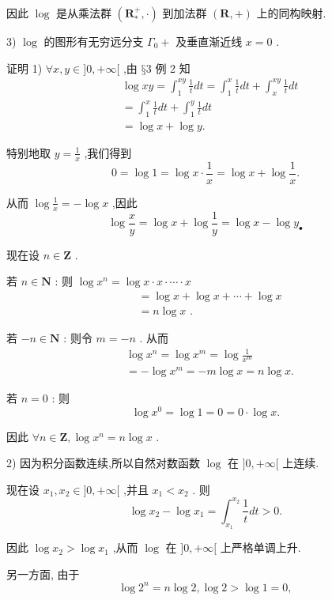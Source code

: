 因此 $\log$ 是从乘法群 $\left( {{\mathbf{R}}_{ * }^{ + }, \cdot  }\right)$ 到加法群 $\left( {\mathbf{R}, + }\right)$ 上的同构映射.

3) $\log$ 的图形有无穷远分支 ${\Gamma }_{0} +$ 及垂直渐近线 $x = 0$ .

证明 1) $\forall x,y \in  \rbrack 0, + \infty \lbrack$ ,由 $§3$ 例 2 知
\begin{align*}
	&\log {xy} = {\int }_{1}^{xy}\frac{1}{t}{dt} = {\int }_{1}^{x}\frac{1}{t}{dt} + {\int }_{x}^{xy}\frac{1}{t}{dt}\\
	&= {\int }_{1}^{x}\frac{1}{t}{dt} + {\int }_{1}^{y}\frac{1}{t}{dt}\\
	&= \log x + \log y.
\end{align*}

特别地取 $y = \frac{1}{x}$ ,我们得到
$$0 = \log 1 = \log x \cdot  \frac{1}{x} = \log x + \log \frac{1}{x}.$$

从而 $\log \frac{1}{x} =  - \log x$ ,因此
$$\log \frac{x}{y} = \log x + \log \frac{1}{y} = \log x - \log {y}_{ \bullet  }$$

现在设 $n \in  \mathbf{Z}$ .

若 $n \in  \mathbf{N}$ : 则 $\log {x}^{n} = \log x \cdot  x \cdot  \cdots  \cdot  x$
\begin{align*}
	&= \log x + \log x + \cdots  + \log x\\
	&= n\log x\text{ . }
\end{align*}

若 $- n \in  \mathbf{N}$ : 则令 $m =  - n$ . 从而
\begin{align*}
	&\log {x}^{n} = \log {x}^{m} = \log \frac{1}{{x}^{m}}\\
	&=  - \log {x}^{m} =  - m\log x = n\log x.
\end{align*}

若 $n = 0$ : 则
$$\log {x}^{0} = \log 1 = 0 = 0 \cdot  \log x.$$

因此 $\forall n \in  \mathbf{Z},\log {x}^{n} = n\log x$ .

2) 因为积分函数连续,所以自然对数函数 $\log$ 在 $\rbrack 0, + \infty \lbrack$ 上连续.

现在设 ${x}_{1},{x}_{2} \in  \rbrack 0, + \infty \lbrack$ ,并且 ${x}_{1} < {x}_{2}$ . 则
$$\log {x}_{2} - \log {x}_{1} = {\int }_{{x}_{1}}^{{x}_{2}}\frac{1}{t}{dt} > 0.$$

因此 $\log {x}_{2} > \log {x}_{1}$ ,从而 $\log$ 在 $\rbrack 0, + \infty \lbrack$ 上严格单调上升.

另一方面, 由于
$$\log {2}^{n} = n\log 2,\log 2 > \log 1 = 0,$$


